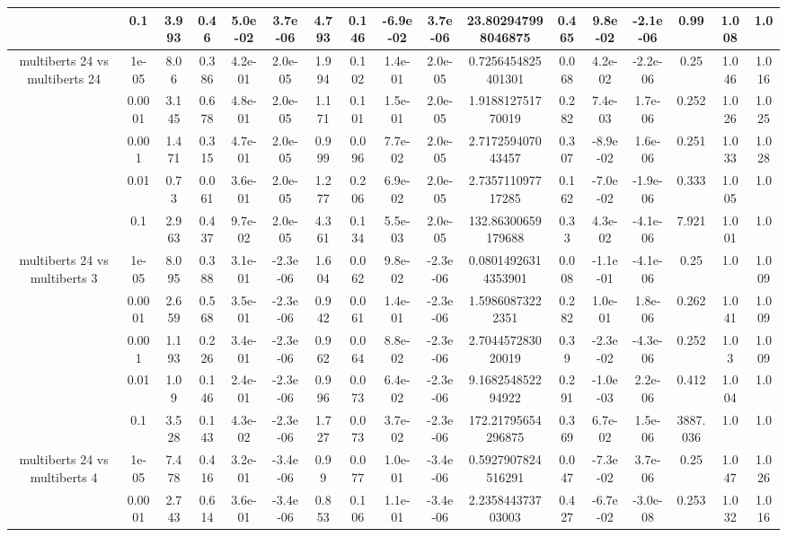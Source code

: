 \begin{tabular}{|c|c|c|c|c|c|c|c|c|c|c|c|c|c|c|c|c|}
 & 0.1 & 3.993 & 0.46 & 5.0e-02 & 3.7e-06 & 4.793 & 0.146 & -6.9e-02 & 3.7e-06 & 23.802947998046875 & 0.465 & 9.8e-02 & -2.1e-06 & 0.99 & 1.008 & 1.0 \\
\hline
\multirow{5}{*}{multiberts 24 vs multiberts 24} & 1e-05 & 8.06 & 0.386 & 4.2e-01 & 2.0e-05 & 1.994 & 0.102 & 1.4e-01 & 2.0e-05 & 0.7256454825401301 & 0.068 & 4.2e-02 & -2.2e-06 & 0.25 & 1.046 & 1.016 \\
 & 0.0001 & 3.145 & 0.678 & 4.8e-01 & 2.0e-05 & 1.171 & 0.101 & 1.5e-01 & 2.0e-05 & 1.918812751770019 & 0.282 & 7.4e-03 & 1.7e-06 & 0.252 & 1.026 & 1.025 \\
 & 0.001 & 1.471 & 0.315 & 4.7e-01 & 2.0e-05 & 0.999 & 0.096 & 7.7e-02 & 2.0e-05 & 2.717259407043457 & 0.307 & -8.9e-02 & 1.6e-06 & 0.251 & 1.033 & 1.028 \\
 & 0.01 & 0.73 & 0.061 & 3.6e-01 & 2.0e-05 & 1.277 & 0.206 & 6.9e-02 & 2.0e-05 & 2.735711097717285 & 0.162 & -7.0e-02 & -1.9e-06 & 0.333 & 1.005 & 1.0 \\
 & 0.1 & 2.963 & 0.437 & 9.7e-02 & 2.0e-05 & 4.361 & 0.134 & 5.5e-03 & 2.0e-05 & 132.86300659179688 & 0.33 & 4.3e-02 & -4.1e-06 & 7.921 & 1.001 & 1.0 \\
\hline
\multirow{5}{*}{multiberts 24 vs multiberts 3} & 1e-05 & 8.095 & 0.388 & 3.1e-01 & -2.3e-06 & 1.604 & 0.062 & 9.8e-02 & -2.3e-06 & 0.08014926314353901 & 0.008 & -1.1e-01 & -4.1e-06 & 0.25 & 1.0 & 1.009 \\
 & 0.0001 & 2.659 & 0.568 & 3.5e-01 & -2.3e-06 & 0.942 & 0.061 & 1.4e-01 & -2.3e-06 & 1.59860873222351 & 0.282 & 1.0e-01 & 1.8e-06 & 0.262 & 1.041 & 1.009 \\
 & 0.001 & 1.193 & 0.226 & 3.4e-01 & -2.3e-06 & 0.962 & 0.064 & 8.8e-02 & -2.3e-06 & 2.704457283020019 & 0.39 & -2.3e-02 & -4.3e-06 & 0.252 & 1.03 & 1.009 \\
 & 0.01 & 1.09 & 0.146 & 2.4e-01 & -2.3e-06 & 0.996 & 0.073 & 6.4e-02 & -2.3e-06 & 9.168254852294922 & 0.291 & -1.0e-03 & 2.2e-06 & 0.412 & 1.004 & 1.0 \\
 & 0.1 & 3.528 & 0.143 & 4.3e-02 & -2.3e-06 & 1.727 & 0.073 & 3.7e-02 & -2.3e-06 & 172.21795654296875 & 0.369 & 6.7e-02 & 1.5e-06 & 3887.036 & 1.0 & 1.0 \\
\hline
\multirow{5}{*}{multiberts 24 vs multiberts 4} & 1e-05 & 7.478 & 0.416 & 3.2e-01 & -3.4e-06 & 0.99 & 0.077 & 1.0e-01 & -3.4e-06 & 0.5927907824516291 & 0.047 & -7.3e-02 & 3.7e-06 & 0.25 & 1.047 & 1.026 \\
 & 0.0001 & 2.743 & 0.614 & 3.6e-01 & -3.4e-06 & 0.853 & 0.106 & 1.1e-01 & -3.4e-06 & 2.235844373703003 & 0.427 & -6.7e-02 & -3.0e-08 & 0.253 & 1.032 & 1.016 \\

\end{tabular}
